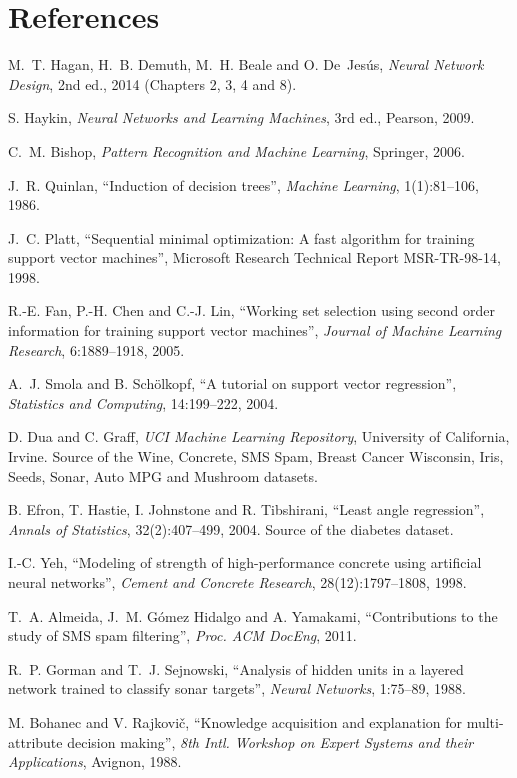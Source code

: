 \section*{References}
\begin{enumerate}[label={[\arabic*]}, leftmargin=2.2em, itemsep=1pt, font=\small]
\small
\item M.~T. Hagan, H.~B. Demuth, M.~H. Beale and O. De~Jesús, \emph{Neural Network Design}, 2nd ed., 2014 (Chapters 2, 3, 4 and 8).
\item S. Haykin, \emph{Neural Networks and Learning Machines}, 3rd ed., Pearson, 2009.
\item C.~M. Bishop, \emph{Pattern Recognition and Machine Learning}, Springer, 2006.
\item J.~R. Quinlan, ``Induction of decision trees'', \emph{Machine Learning}, 1(1):81--106, 1986.
\item J.~C. Platt, ``Sequential minimal optimization: A fast algorithm for training support vector machines'', Microsoft Research Technical Report MSR-TR-98-14, 1998.
\item R.-E. Fan, P.-H. Chen and C.-J. Lin, ``Working set selection using second order information for training support vector machines'', \emph{Journal of Machine Learning Research}, 6:1889--1918, 2005.
\item A.~J. Smola and B. Schölkopf, ``A tutorial on support vector regression'', \emph{Statistics and Computing}, 14:199--222, 2004.
\item D. Dua and C. Graff, \emph{UCI Machine Learning Repository}, University of California, Irvine. Source of the Wine, Concrete, SMS Spam, Breast Cancer Wisconsin, Iris, Seeds, Sonar, Auto MPG and Mushroom datasets.
\item B. Efron, T. Hastie, I. Johnstone and R. Tibshirani, ``Least angle regression'', \emph{Annals of Statistics}, 32(2):407--499, 2004. Source of the diabetes dataset.
\item I.-C. Yeh, ``Modeling of strength of high-performance concrete using artificial neural networks'', \emph{Cement and Concrete Research}, 28(12):1797--1808, 1998.
\item T.~A. Almeida, J.~M. Gómez Hidalgo and A. Yamakami, ``Contributions to the study of SMS spam filtering'', \emph{Proc. ACM DocEng}, 2011.
\item R.~P. Gorman and T.~J. Sejnowski, ``Analysis of hidden units in a layered network trained to classify sonar targets'', \emph{Neural Networks}, 1:75--89, 1988.
\item M. Bohanec and V. Rajkovič, ``Knowledge acquisition and explanation for multi-attribute decision making'', \emph{8th Intl. Workshop on Expert Systems and their Applications}, Avignon, 1988.
\end{enumerate}
